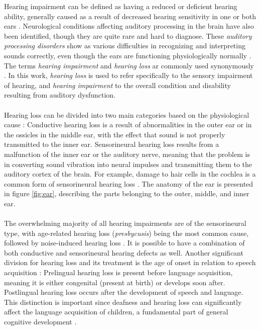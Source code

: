 \documentclass[english, 12pt, a4paper, pdftex, elec, utf8]{aaltothesis}
\begin{document}
Hearing impairment can be defined as having a reduced or deficient hearing ability, generally caused as a result of decreased hearing sensitivity in one or both ears \cite{moore2007cochlear, ohlenforst2017effects}. Neurological conditions affecting auditory processing in the brain have also been identified, though they are quite rare and hard to diagnose. These \textit{auditory processing disorders} show as various difficulties in recognizing and interpreting sounds correctly, even though the ears are functioning physiologically normally \cite{deafness}. The terms \textit{hearing impairment} and \textit{hearing loss} ar commonly used synonymously \cite{moore2007cochlear}. In this work, \textit{hearing loss} is used to refer specifically to the sensory impairment of hearing, and \textit{hearing impairment} to the overall condition and disability resulting from auditory dysfunction. \\\\
Hearing loss can be divided into two main categories based on the physiological cause \cite{moore2007cochlear, deafness}: Conductive hearing loss is a result of abnormalities in the outer ear or in the ossicles in the middle ear, with the effect that sound is not properly transmitted to the inner ear. Sensorineural hearing loss results from a malfunction of the inner ear or the auditory nerve, meaning that the problem is in converting sound vibration into neural impulses and transmitting them to the auditory cortex of the brain. For example, damage to hair cells in the cochlea is a common form of sensorineural hearing loss \cite{moore2007cochlear}. The anatomy of the ear is presented in figure \ref{fig:ear}, describing the parts belonging to the outer, middle, and inner ear. \\\\
The overwhelming majority of all hearing impairments are of the sensorineural type, with age-related hearing loss (\textit{presbycusis}) being the most common cause, followed by noise-induced hearing loss \cite{koskela2013kuulokojeen}. It is possible to have a combination of both conductive and sensorineural hearing defects as well. Another significant division for hearing loss and its treatment is the age of onset in relation to speech acquisition \cite{deafness, raino2012sisakorvaistutteen}: Prelingual hearing loss is present before language acquisition, meaning it is either congenital (present at birth) or develops soon after. Postlingual hearing loss occurs after the development of speech and language. This distinction is important since deafness and hearing loss can significantly affect the language acquisition of children, a fundamental part of general cognitive development \cite{wilson2017global, moore2007cochlear, raino2012sisakorvaistutteen}. \\
\end{document}
